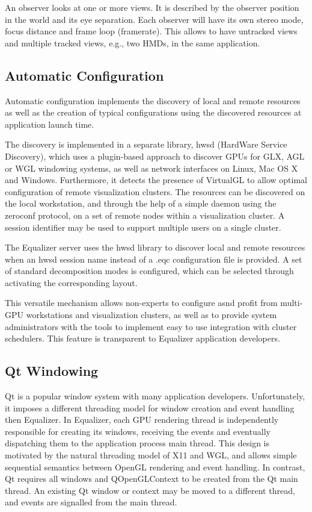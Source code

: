 \documentclass[journal]{vgtc}                %
\begin{document}
\label{SEC_observer}
An observer looks at one or more views. It is described by the observer position
in the world and its eye separation. Each observer will have its own stereo
mode, focus distance and frame loop (framerate). This allows to have untracked
views and multiple tracked views, e.g., two HMDs, in the same application.

\subsection{Automatic Configuration}

Automatic configuration implements the discovery of local and remote resources
as well as the creation of typical configurations using the discovered resources
at application launch time.

The discovery is implemented in a separate library, hwsd (HardWare Service
Discovery), which uses a plugin-based approach to discover GPUs for GLX, AGL or
WGL windowing systems, as well as network interfaces on Linux, Mac OS X and
Windows. Furthermore, it detects the presence of VirtualGL to allow optimal
configuration of remote visualization clusters. The resources can be discovered
on the local workstation, and through the help of a simple daemon using the
zeroconf protocol, on a set of remote nodes within a visualization cluster. A
session identifier may be used to support multiple users on a single cluster.

The Equalizer server uses the hwsd library to discover local and remote
resources when an hwsd session name instead of a \textsf{.eqc} configuration
file is provided. A set of standard decomposition modes is configured, which can
be selected through activating the corresponding layout.

This versatile mechanism allows non-experts to configure asnd profit from
multi-GPU workstations and visualization clusters, as well as to provide system
administrators with the tools to implement easy to use integration with cluster
schedulers. This feature is transparent to Equalizer application developers.

\subsection{Qt Windowing}

Qt is a popular window system with many application developers. Unfortunately,
it imposes a different threading model for window creation and event handling
then Equalizer. In Equalizer, each GPU rendering thread is independently
responsible for creating its windows, receiving the events and eventually
dispatching them to the application process main thread. This design is
motivated by the natural threading model of X11 and WGL, and allows simple
sequential semantics between OpenGL rendering and event handling. In contrast,
Qt requires all windows and QOpenGLContext to be created from the Qt main
thread. An existing Qt window or context may be moved to a different thread, and
events are signalled from the main thread.
\end{document}
